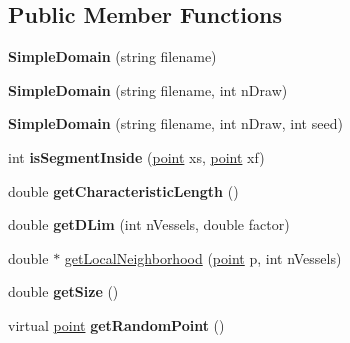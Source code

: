 \subsection*{Public Member Functions}
\begin{DoxyCompactItemize}
\item 
\mbox{\label{class_simple_domain_a75ad930e0927e7472834561bdde58a0f}} 
{\bfseries Simple\+Domain} (string filename)
\item 
\mbox{\label{class_simple_domain_aa98ca68b90e658ea2da4b7f097b2a089}} 
{\bfseries Simple\+Domain} (string filename, int n\+Draw)
\item 
\mbox{\label{class_simple_domain_a1bb1a2b9e766a230f7075784765db93d}} 
{\bfseries Simple\+Domain} (string filename, int n\+Draw, int seed)
\item 
\mbox{\label{class_simple_domain_ab1e60afe4302149098b11631d20aebb7}} 
int {\bfseries is\+Segment\+Inside} (\mbox{\hyperlink{structpoint}{point}} xs, \mbox{\hyperlink{structpoint}{point}} xf)
\item 
\mbox{\label{class_simple_domain_a2a7e2919f633368b85aa3e9cfd0e57ab}} 
double {\bfseries get\+Characteristic\+Length} ()
\item 
\mbox{\label{class_simple_domain_a1a893631be7a86959363ac338d47d155}} 
double {\bfseries get\+D\+Lim} (int n\+Vessels, double factor)
\item 
double $\ast$ \mbox{\hyperlink{class_simple_domain_ab15fbbfdc57f70582355bb25c6a4bec6}{get\+Local\+Neighborhood}} (\mbox{\hyperlink{structpoint}{point}} p, int n\+Vessels)
\item 
\mbox{\label{class_simple_domain_a0a05345c81234a3e616447a16e9150c0}} 
double {\bfseries get\+Size} ()
\item 
\mbox{\label{class_simple_domain_afcf98b009584217d8ab03e0dbfa86839}} 
virtual \mbox{\hyperlink{structpoint}{point}} {\bfseries get\+Random\+Point} ()
\item 
\mbox{\label{class_simple_domain_aff393038753eb445c2acc416fe72910b}} 

\end{DoxyCompactItemize}

